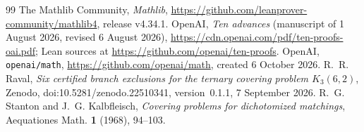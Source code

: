 \documentclass[11pt]{amsart}
\theoremstyle{definition}
\theoremstyle{remark}
\begin{document}
\begin{thebibliography}{99}
The Mathlib Community, \emph{Mathlib}, \url{https://github.com/leanprover-community/mathlib4}, release v4.34.1.
OpenAI, \emph{Ten advances} (manuscript of 1 August 2026, revised 6 August 2026), \url{https://cdn.openai.com/pdf/ten-proofs-oai.pdf}; Lean sources at \url{https://github.com/openai/ten-proofs}.
OpenAI, \texttt{openai/math}, \url{https://github.com/openai/math}, created 6 October 2026.
R.~R. Raval, \emph{Six certified branch exclusions for the ternary covering problem $K_3(6,2)$}, Zenodo, doi:10.5281/zenodo.22510341, version~0.1.1, 7 September 2026.
R.~G. Stanton and J.~G. Kalbfleisch, \emph{Covering problems for dichotomized matchings}, Aequationes Math. \textbf{1} (1968), 94--103.
\end{thebibliography}
\end{document}
